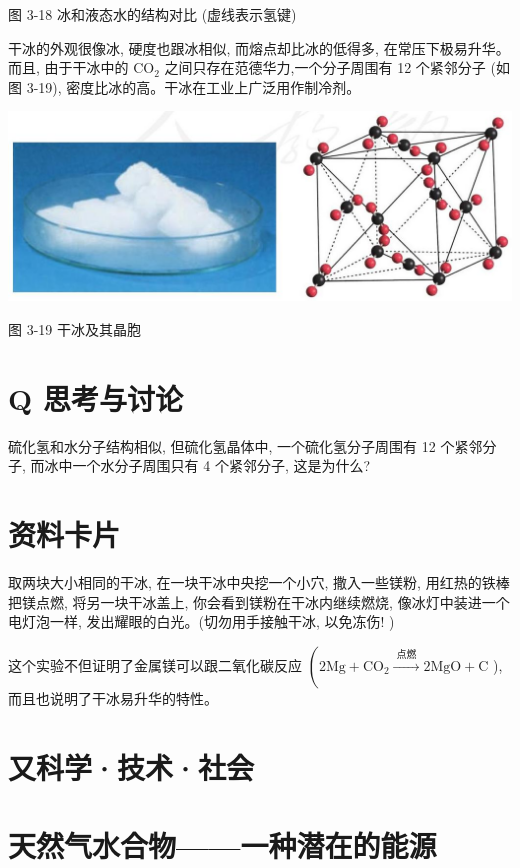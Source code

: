 \documentclass[10pt]{article}
\begin{document}
图 3-18 冰和液态水的结构对比 (虚线表示氢键)

干冰的外观很像冰, 硬度也跟冰相似, 而熔点却比冰的低得多, 在常压下极易升华。而且, 由于干冰中的 \({\mathrm{{CO}}}_{2}\) 之间只存在范德华力,一个分子周围有 12 个紧邻分子 (如图 3-19), 密度比冰的高。干冰在工业上广泛用作制冷剂。

\begin{center}
\includegraphics[max width=1.0\textwidth]{images/0190e026-5a11-7df7-bd27-54d09026ba7a_82_631322.jpg}
\end{center}

图 3-19 干冰及其晶胞

\section*{Q 思考与讨论}

硫化氢和水分子结构相似, 但硫化氢晶体中, 一个硫化氢分子周围有 12 个紧邻分子, 而冰中一个水分子周围只有 4 个紧邻分子, 这是为什么?

\section*{资料卡片}

取两块大小相同的干冰, 在一块干冰中央挖一个小穴, 撒入一些镁粉, 用红热的铁棒把镁点燃, 将另一块干冰盖上, 你会看到镁粉在干冰内继续燃烧, 像冰灯中装进一个电灯泡一样, 发出耀眼的白光。(切勿用手接触干冰, 以免冻伤! )

这个实验不但证明了金属镁可以跟二氧化碳反应 \(\left( {2\mathrm{{Mg}} + {\mathrm{{CO}}}_{2}\xrightarrow[]{\text{ 点燃 }}2\mathrm{{MgO}} + \mathrm{C}}\right.\) ),而且也说明了干冰易升华的特性。

\section*{又科学·技术·社会}

\section*{天然气水合物——一种潜在的能源}
\end{document}
